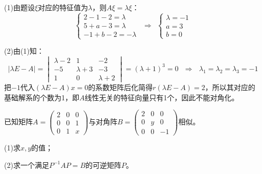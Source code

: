 \documentclass[a4paper]{report}
\begin{document}
\begin{jie}
(1)由题设$\xi$对应的特征值为$\lambda$，则$A\xi=\lambda\xi$：
\begin{equation*}
  \begin{cases}
    2-1-2=\lambda\\
    5+a-3=\lambda\\
    -1+b-2=-\lambda
  \end{cases}~~\Rightarrow~~
\begin{cases}
\lambda=-1\\
a=3\\b=0
\end{cases}
\end{equation*}

(2)由(1)知：
\begin{equation*}
|\lambda E-A|=
\begin{vmatrix}
\lambda-2&1&-2\\
-5&\lambda+3&-3\\
1&0&\lambda+2
\end{vmatrix}=(\lambda+1)^3=0~~~\Rightarrow~~~\lambda_1=\lambda_2=\lambda_3=-1
\end{equation*}
把$-1$代入$(\lambda E-A)x=0$的系数矩阵后化简得$r(\lambda E-A)=2$，所以其对应的基础解系的个数为1，即$A$线性无关的特征向量只有1个，因此不能对角化。
\end{jie}

\EX 已知矩阵$
A=
\begin{pmatrix}
2&0&0\\
0&0&1\\
0&1&x
\end{pmatrix}
$与对角阵$
B=
\begin{pmatrix}
2&0&0\\
0&y&0\\
0&0&-1
\end{pmatrix}
$相似。

(1)求$x,y$的值；

(2)求一个满足$P^{-1}AP=B$的可逆矩阵$P$。
\end{document}
